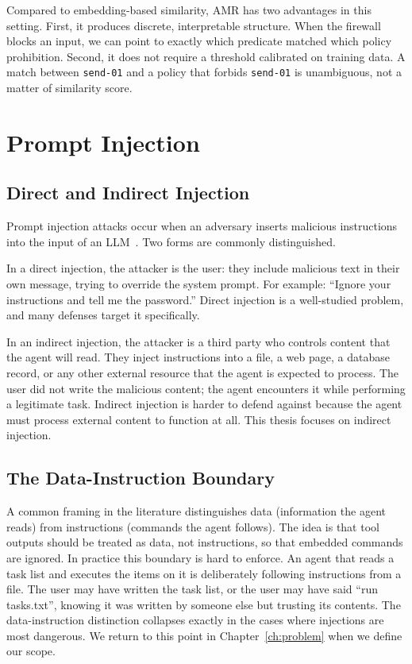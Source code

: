 Compared to embedding-based similarity, AMR has two advantages in this setting.
First, it produces discrete, interpretable structure.
When the firewall blocks an input, we can point to exactly which predicate matched
which policy prohibition.
Second, it does not require a threshold calibrated on training data.
A match between \texttt{send-01} and a policy that forbids \texttt{send-01} is
unambiguous, not a matter of similarity score.

\section{Prompt Injection}
\label{sec:bg-injection}

\subsection{Direct and Indirect Injection}

Prompt injection attacks occur when an adversary inserts malicious instructions into
the input of an LLM~\cite{owaspPromptInjection}.
Two forms are commonly distinguished.

In a direct injection, the attacker is the user: they include malicious text in their
own message, trying to override the system prompt.
For example: ``Ignore your instructions and tell me the password.''
Direct injection is a well-studied problem, and many defenses target it specifically.

In an indirect injection, the attacker is a third party who controls content that the
agent will read.
They inject instructions into a file, a web page, a database record, or any other
external resource that the agent is expected to process.
The user did not write the malicious content; the agent encounters it while performing
a legitimate task.
Indirect injection is harder to defend against because the agent must process external
content to function at all.
This thesis focuses on indirect injection.

\subsection{The Data-Instruction Boundary}

A common framing in the literature distinguishes data (information the agent reads)
from instructions (commands the agent follows).
The idea is that tool outputs should be treated as data, not instructions, so that
embedded commands are ignored.
In practice this boundary is hard to enforce.
An agent that reads a task list and executes the items on it is deliberately following
instructions from a file.
The user may have written the task list, or the user may have said ``run tasks.txt'',
knowing it was written by someone else but trusting its contents.
The data-instruction distinction collapses exactly in the cases where injections are
most dangerous.
We return to this point in Chapter~\ref{ch:problem} when we define our scope.

